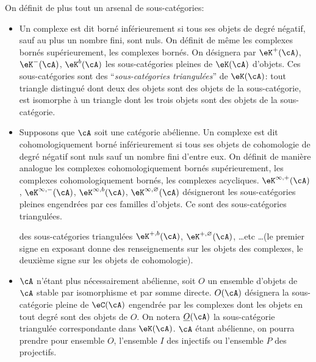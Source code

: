 On définit de plus tout un arsenal de sous-catégories: 
\begin{itemize}
  \item Un complexe est dit borné inférieurement si tous ses objets de 
    degré négatif, sauf au plus un nombre fini, sont nuls. On définit de 
    même les complexes bornés supérieurement, les complexes bornés. On 
    désignera par $\eK^+(\cA)$, $\eK^-(\cA)$, $\eK^b(\cA)$ les 
    sous-catégories pleines de $\eK(\cA)$  
    d'objets. Ces sous-catégories sont des ``\emph{sous-catégories 
    triangulées}'' de $\eK(\cA)$: tout triangle distingué dont deux des 
    objets sont des objets de la sous-catégorie, est isomorphe à un 
    triangle dont les trois objets sont des objets de la sous-catégorie. 
  \item Supposons que $\cA$ soit une catégorie abélienne. Un complexe est 
    dit cohomologiquement borné inférieurement si tous ses objets de 
    cohomologie de degré négatif sont nuls sauf un nombre fini d'entre 
    eux. On définit de manière analogue les complexes cohomologiquement 
    bornés supérieurement, les complexes cohomologiquement bornés, les 
    complexes acycliques. $\eK^{\infty,+}(\cA)$, $\eK^{\infty,-}(\cA)$, 
    $\eK^{\infty,b}(\cA)$, $\eK^{\infty,\varnothing}(\cA)$ désigneront les 
    sous-catégories pleines engendrées par ces familles d'objets. Ce sont 
    des sous-catégories triangulées. 
    
     des sous-catégories triangulées $\eK^{+,b}(\cA)$, 
    $\eK^{+,\varnothing}(\cA)$, \ldots etc \ldots (le premier signe en 
    exposant donne des renseignements sur les objets des complexes, le 
    deuxième signe sur les objets de cohomologie). 
  \item $\cA$ n'étant plus nécessairement abélienne, soit $O$ un 
    ensemble d'objets de $\cA$ stable par isomorphisme et par somme directe. 
    $O(\cA)$ désignera la sous-catégorie pleine de $\eC(\cA)$ engendrée 
    par les complexes dont les objets en tout degré sont des objets de $O$. 
    On notera $\underline O(\cA)$ la sous-catégorie triangulée 
    correspondante dans $\eK(\cA)$. $\cA$ étant abélienne, on pourra 
    prendre pour ensemble $O$, l'ensemble $I$ des injectifs ou l'ensemble $P$ 
    des projectifs. 
\end{itemize}





